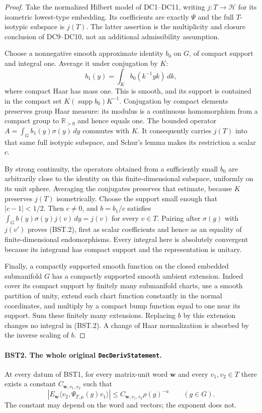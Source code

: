 \documentclass[11pt,a4paper]{article}
\numberwithin{equation}{section}
\theoremstyle{remark}\newtheorem{remark}[theorem]{Remark}
\begin{document}
\begin{proof}
Take the normalized Hilbert model of DC1--DC11, writing $j:T\to
\mathcal H$ for its isometric lowest-type embedding.  Its coefficients
are exactly $\Psi$ and the full $T$-isotypic subspace is $j(T)$.
The latter assertion is the multiplicity and closure conclusion of
DC9--DC10, not an additional admissibility assumption.

Choose a nonnegative smooth approximate identity $b_0$ on $G$, of
compact support and integral one.  Average it under conjugation by
$K$:
\[
 b_1(y)=\int_K b_0(k^{-1}yk)\,dk ,
 \tag{BST.3}
\]
where compact Haar has mass one.  This is smooth, and its support is
contained in the compact set $K(\operatorname{supp}b_0)K^{-1}$.
Conjugation by compact elements preserves group Haar measure: its
modulus is a continuous homomorphism from a compact group to
$\mathbb R_{>0}$ and hence equals one.
The bounded operator $A=\int_G b_1(y)\sigma(y)\,dy$ commutes with
$K$.  It consequently carries $j(T)$ into that same full isotypic
subspace, and Schur's lemma makes its restriction a scalar $c$.

By strong continuity, the operators obtained from a sufficiently small
$b_0$ are arbitrarily close to the identity on this finite-dimensional
subspace, uniformly on its unit sphere.  Averaging the conjugates
preserves that estimate, because $K$ preserves $j(T)$ isometrically.
Choose the support small enough that $|c-1|<1/2$.  Then $c\ne0$,
and $b=b_1/c$ satisfies
$\int_G b(y)\sigma(y)j(v)\,dy=j(v)$ for every $v\in T$.
Pairing after $\sigma(g)$ with $j(v')$ proves (BST.2), first as
scalar coefficients and hence as an equality of finite-dimensional
endomorphisms.  Every integral here is absolutely convergent because
its integrand has compact support and the representation is unitary.

Finally, a compactly supported smooth function on the closed embedded
submanifold $G$ has a compactly supported smooth ambient extension.
Indeed cover its compact support by finitely many submanifold charts,
use a smooth partition of unity, extend each chart function constantly
in the normal coordinates, and multiply by a compact bump function
equal to one near its support.  Sum these finitely many extensions.
Replacing $b$ by this extension changes no integral in (BST.2).
A change of Haar normalization is absorbed by the inverse scaling
of $b$.
\end{proof}

\paragraph{BST2. The whole original \texttt{Dec\allowbreak Deriv\allowbreak Statement}.}
\label{claim:BST2}
At every datum of BST1, for every matrix-unit word $\mathbf w$
and every $v_1,v_2\in T$ there exists a constant $C_{\mathbf w,v_1,v_2}$
such that
\[
 \left|E_{\mathbf w}
       \langle v_2,\Psi_{T,\mu}(g)v_1\rangle\right|
       \le C_{\mathbf w,v_1,v_2}\rho(g)^{-a}
       \qquad(g\in G).
 \tag{BST.4}
\]
The constant may depend on the word and vectors; the exponent does not.
\end{document}
